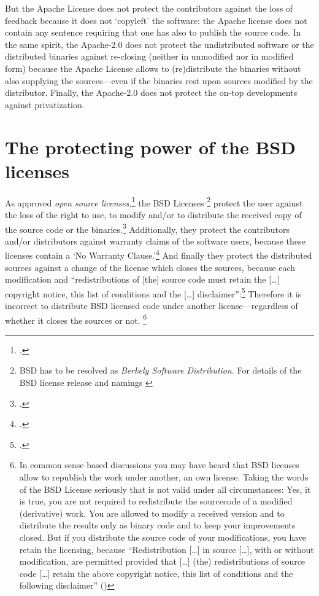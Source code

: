 But the Apache License does not protect the contributors against the loss of
feedback because it does not `copyleft' the software: the Apache license does
not contain any sentence requiring that one has also to publish the source code.
In the same spirit, the Apache-2.0 does not protect the undistributed software or the
distributed binaries against re-closing (neither in unmodified nor in
modified form) because the Apache License allows to (re)distribute the
binaries without also supplying the sources---even if the binaries rest upon
sources modified by the distributor. Finally, the Apache-2.0 does not protect the
on-top developments against privatization.


\section{\texorpdfstring{The protecting power of the}{The} BSD licenses}

As approved \emph{open source licenses,}\footcite[cf.][\nopage wp]{OSI2012b} the
BSD Licenses%
  \footnote{BSD has to be resolved as \emph{Berkely Software Distribution}. 
  For details of the BSD license release and namings
  \cite[cf.][\nopage wp.\ editorial]{BsdLicense3Clause}} 
protect the user against
the loss of the right to use, to modify and/or to distribute the received copy
of the source code or the binaries.\footcite[cf.][\nopage wp. §1ff]{OSI2012a}
Additionally, they protect the contributors and/or distributors against warranty
claims of the software users, because these licenses contain a `No Warranty
Clause.'\footcite[one for all version cf.][\nopage wp]{BsdLicense2Clause} And
finally they protect the distributed sources against a change of the license
which closes the sources, because each modification and \enquote{redistributions
of [the] source code must retain the [\ldots] copyright notice, this list of
conditions and the [\ldots] disclaimer}:\footcite[cf.][\nopage
wp]{BsdLicense2Clause} Therefore it is incorrect to distribute BSD licensed
code under another license---regardless of whether it closes the sources or
not.%
  \footnote{In common sense based discussions you may have heard that BSD
  licenses allow to republish the work under another, an own license. Taking the
  words of the BSD License seriously that is not valid under all circumstances:
  Yes, it is true, you are not required to redistribute the sourcecode of a
  modified (derivative) work. You are allowed to modify a received version and to
  distribute the results only as binary code and to keep your improvements closed.
  But if you distribute the source code of your modifications, you have retain the
  licensing, because \enquote{Redistribution [\ldots] in source [\ldots], with or
  without modification, are permitted provided that [\ldots] (the) redistributions
  of source code [\ldots] retain the above copyright notice, this list of
  conditions and the following disclaimer} (\cite[cf.][\nopage
  wp]{BsdLicense2Clause})}

